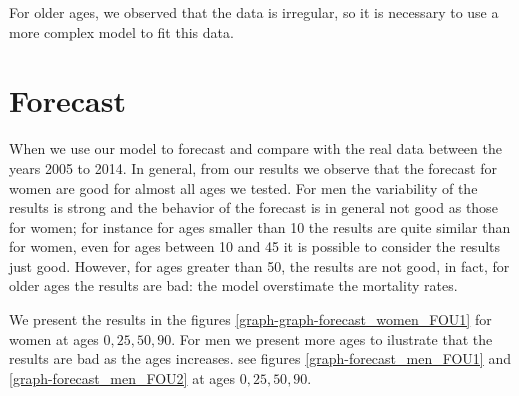 \documentclass[smallextended]{svjour3}
\begin{document}
For older ages, we observed that the data is irregular, so it is necessary to
use a more complex model to
fit this data.

\section{Forecast}

When we use our model to forecast and compare with the real data between the
years 2005 to 2014. In general, from our results we observe that the forecast
for women are good for almost all ages we tested. For men the variability of
the results is strong and the behavior of the forecast is in general not good
as those for women; for instance for ages smaller than 10 the results are quite
similar than for women, even for ages between 10 and 45 it is possible to
consider the results just good. However, for ages greater than 50, the results
are not good, in fact, for older ages the results are bad: the model
overstimate the mortality rates.

We present the results in the figures \ref{graph-graph-forecast_women_FOU1} for
women at ages $0,25,50,90$. For men we present more ages to ilustrate that the
results are bad as the ages increases. see figures
\ref{graph-forecast_men_FOU1} and \ref{graph-forecast_men_FOU2} at ages
$0,25,50,90$.
\end{document}
